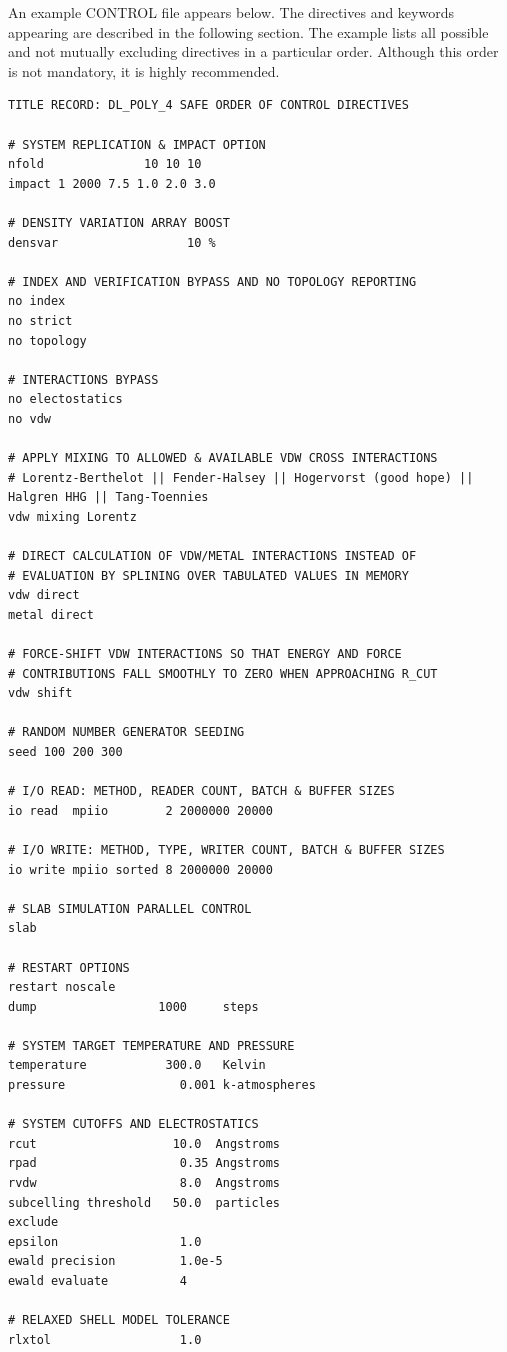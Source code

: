 An example CONTROL file appears below.  The directives and
keywords appearing are described in the following section.  The
example lists all possible and not mutually excluding directives
in a particular order.  Although this order is not mandatory, it
is highly recommended.

\begin{lstlisting}
TITLE RECORD: DL_POLY_4 SAFE ORDER OF CONTROL DIRECTIVES

# SYSTEM REPLICATION & IMPACT OPTION
nfold              10 10 10
impact 1 2000 7.5 1.0 2.0 3.0

# DENSITY VARIATION ARRAY BOOST
densvar                  10 %

# INDEX AND VERIFICATION BYPASS AND NO TOPOLOGY REPORTING
no index
no strict
no topology

# INTERACTIONS BYPASS
no electostatics
no vdw

# APPLY MIXING TO ALLOWED & AVAILABLE VDW CROSS INTERACTIONS
# Lorentz-Berthelot || Fender-Halsey || Hogervorst (good hope) || Halgren HHG || Tang-Toennies
vdw mixing Lorentz

# DIRECT CALCULATION OF VDW/METAL INTERACTIONS INSTEAD OF
# EVALUATION BY SPLINING OVER TABULATED VALUES IN MEMORY
vdw direct
metal direct

# FORCE-SHIFT VDW INTERACTIONS SO THAT ENERGY AND FORCE
# CONTRIBUTIONS FALL SMOOTHLY TO ZERO WHEN APPROACHING R_CUT
vdw shift

# RANDOM NUMBER GENERATOR SEEDING
seed 100 200 300

# I/O READ: METHOD, READER COUNT, BATCH & BUFFER SIZES
io read  mpiio        2 2000000 20000

# I/O WRITE: METHOD, TYPE, WRITER COUNT, BATCH & BUFFER SIZES
io write mpiio sorted 8 2000000 20000

# SLAB SIMULATION PARALLEL CONTROL
slab

# RESTART OPTIONS
restart noscale
dump                 1000     steps

# SYSTEM TARGET TEMPERATURE AND PRESSURE
temperature           300.0   Kelvin
pressure                0.001 k-atmospheres

# SYSTEM CUTOFFS AND ELECTROSTATICS
rcut                   10.0  Angstroms
rpad                    0.35 Angstroms
rvdw                    8.0  Angstroms
subcelling threshold   50.0  particles
exclude
epsilon                 1.0
ewald precision         1.0e-5
ewald evaluate          4

# RELAXED SHELL MODEL TOLERANCE
rlxtol                  1.0


\end{lstlisting}
